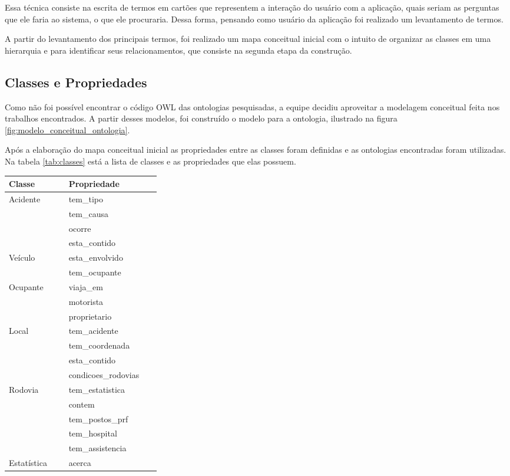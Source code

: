       Essa técnica consiste na escrita de termos em cartões que representem a interação do usuário com a aplicação,
      quais seriam as perguntas que ele faria ao sistema, o que ele procuraria. Dessa forma, pensando como usuário
      da aplicação foi realizado um levantamento de termos.

      A partir do levantamento dos principais termos, foi realizado um mapa conceitual inicial com o intuito
      de organizar as classes em uma hierarquia e para identificar seus relacionamentos, que consiste na segunda
      etapa da construção.

      \subsection{Classes e Propriedades}
      
	  Como não foi possível encontrar o código OWL das ontologias pesquisadas, a equipe decidiu aproveitar a
	  modelagem conceitual feita nos trabalhos encontrados. A partir desses modelos, foi construído o modelo 
	  para a ontologia, ilustrado na figura \ref{fig:modelo_conceitual_ontologia}.
	  
	  Após a elaboração do mapa conceitual inicial as propriedades entre as classes foram definidas e as ontologias
	  encontradas foram utilizadas. 
	  Na tabela \ref{tab:classes} está a lista de classes e as propriedades que elas possuem.      

	  \begin{table*}[!h]
	  \centering
	  \begin{tabular}{p{0.15\linewidth}p{0.15\linewidth}}
	    \hline
	    \textbf{Classe} & \textbf{Propriedade} \\
	    \hline
	      Acidente & tem\_tipo\\
		& tem\_causa\\
		& ocorre\\
		& esta\_contido\\
	    \hline
	      Veículo & esta\_envolvido\\
		& tem\_ocupante\\
	    \hline
	      Ocupante & viaja\_em\\
		& motorista\\
		& proprietario\\
	    \hline
	      Local & tem\_acidente\\
		& tem\_coordenada\\
		& esta\_contido\\
		& condicoes\_rodovias\\
	    \hline
	      Rodovia & tem\_estatistica\\
		& contem\\
		& tem\_postos\_prf\\
		& tem\_hospital\\
		& tem\_assistencia\\
	    \hline
	      Estatística & acerca\\
	    \hline
	  \end{tabular}
	  \caption{Classes e Propriedades}
	  \label{tab:classes}
	  \end{table*}
	  
